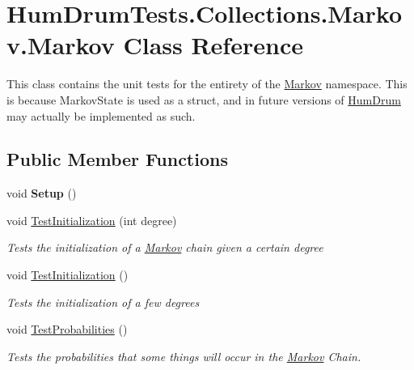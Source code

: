 \hypertarget{classHumDrumTests_1_1Collections_1_1Markov_1_1Markov}{}\section{Hum\+Drum\+Tests.\+Collections.\+Markov.\+Markov Class Reference}
\label{classHumDrumTests_1_1Collections_1_1Markov_1_1Markov}


This class contains the unit tests for the entirety of the \hyperlink{classHumDrumTests_1_1Collections_1_1Markov_1_1Markov}{Markov} namespace. This is because Markov\+State is used as a struct, and in future versions of \hyperlink{namespaceHumDrum}{Hum\+Drum} may actually be implemented as such.  


\subsection*{Public Member Functions}
\begin{DoxyCompactItemize}
\item 
\hypertarget{classHumDrumTests_1_1Collections_1_1Markov_1_1Markov_a84cfa4f299f032a569531b9a541fc2f2}{}void {\bfseries Setup} ()\label{classHumDrumTests_1_1Collections_1_1Markov_1_1Markov_a84cfa4f299f032a569531b9a541fc2f2}

\item 
void \hyperlink{classHumDrumTests_1_1Collections_1_1Markov_1_1Markov_af19a1b51ebd34fe449607616524b737b}{Test\+Initialization} (int degree)
\begin{DoxyCompactList}\small\item\em Tests the initialization of a \hyperlink{classHumDrumTests_1_1Collections_1_1Markov_1_1Markov}{Markov} chain given a certain degree \end{DoxyCompactList}\item 
void \hyperlink{classHumDrumTests_1_1Collections_1_1Markov_1_1Markov_ae1bd8a39206beab40020a71b2293e3a0}{Test\+Initialization} ()
\begin{DoxyCompactList}\small\item\em Tests the initialization of a few degrees \end{DoxyCompactList}\item 
void \hyperlink{classHumDrumTests_1_1Collections_1_1Markov_1_1Markov_ab864cf346f0ef6e2d21ebfe14a06ecff}{Test\+Probabilities} ()
\begin{DoxyCompactList}\small\item\em Tests the probabilities that some things will occur in the \hyperlink{classHumDrumTests_1_1Collections_1_1Markov_1_1Markov}{Markov} Chain. \end{DoxyCompactList}\end{DoxyCompactItemize}


